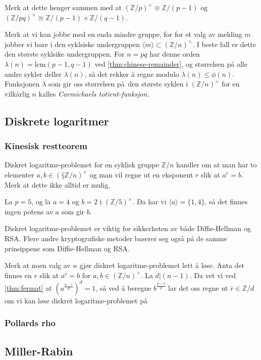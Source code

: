 Merk at dette henger sammen med at ${(\mathbb Z / p)}^\times \cong \mathbb Z / (p - 1)$
og ${(\mathbb Z / pq)}^\times\cong \mathbb Z / (p - 1)\times \mathbb Z / (q - 1)$.

Merk at vi kan jobbe med en enda mindre gruppe,
for for et valg av melding $m$ jobber vi bare i den syklsiske undergruppen
$\langle m\rangle \subset {(\mathbb Z / n)}^\times$.
I beste fall er dette den største syklsike undergruppen.
For $n = pq$ har denne orden $\lambda(n) = \mathrm{lcm}(p - 1, q - 1)$ ved
\cref{thm:chinese-remainder}, og størrelsen på alle andre sykler deller
$\lambda(n)$, så det rekker å regne modulo $\lambda(n) \leq\phi(n)$.
Funksjonen $\lambda$ som gir oss størrelsen på den største syklen
i ${(\mathbb Z / n)}^\times$ for en vilkårlig $n$ kalles
\textit{Carmichaels totient-funksjon}.

\subsection{Diskrete logaritmer}
\subsubsection{Kinesisk restteorem}
Diskret logaritme-problemet for en syklisk gruppe $\mathbb Z / n$
handler om at man har to elementer $a, b\in (§\mathbb Z / n)^\times$
og man vil regne ut en eksponent $r$ slik at $a^r = b$.
Merk at dette ikke alltid er mulig.
\begin{example}
    La $p = 5$, og la $a = 4$ og $b = 2$ i ${(\mathbb Z / 5)}^\times$.
    Da har vi $\langle a\rangle = \{1, 4\}$,
    så det finnes ingen potens av $a$ som gir $b$.
\end{example}

Diskret logaritme-problemet er viktig for sikkerheten av både
Diffie-Hellman og RSA.
Flere andre kryptografiske metoder baserer seg også på de samme prinsippene
som Diffie-Hellman og RSA.

Merk at noen valg av $n$ gjør diskret logaritme-problemet lett å løse.
Anta det finnes en $r$ slik at $a^r = b$ for $a,b\in {(\mathbb Z / n)}^\times$.
La $d | (n - 1)$.
Da vet vi ved \cref{thm:fermat} at $\left(a^{\frac{p - 1} d}\right)^d = 1$,
så ved å beregne $b^{\frac {p - 1} d}$ lar det oss regne ut
$\bar r\in \mathbb Z / d$ om vi kan løse diskret logaritme-problemet
på
\subsubsection{Pollards rho}
\subsection{Miller-Rabin}

